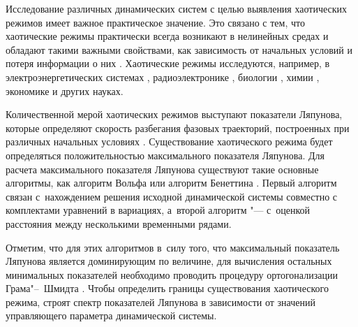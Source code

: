 
\date{}








\renewcommand{\JournalDataOnline}{\displaydate{parovike}}




\makerutitle





 Исследование различных динамических систем с целью выявления хаотических режимов имеет важное практическое значение. Это связано с тем, что хаотические режимы практически всегда возникают в нелинейных средах и обладают такими важными свойствами, как зависимость от начальных условий и потеря информации о них \cite{parovik:1}.  Хаотические режимы исследуются, например, в электроэнергетических системах \cite{parovik:2, parovik:3},  радиоэлектронике \cite{parovik:4}, биологии \cite{parovik:5}, химии \cite{parovik:6}, экономике \cite{parovik:7} и  других науках.



Количественной мерой хаотических режимов выступают показатели Ляпунова, которые определяют скорость разбегания фазовых траекторий, построенных при различных начальных условиях \cite{parovik:8}. Существование хаотического режима будет определяться положительностью максимального показателя Ляпунова. Для расчета максимального показателя Ляпунова существуют такие основные алгоритмы, как алгоритм Вольфа \cite{parovik:9} или алгоритм Бенеттина \cite{parovik:10, parovik:10a}. Первый алгоритм связан с~нахождением решения исходной динамической системы совместно с комплектами уравнений в вариациях, а~второй алгоритм "--- с~оценкой расстояния между несколькими временными рядами. 

Отметим, что для этих алгоритмов в~силу того, что максимальный показатель Ляпунова является доминирующим по величине, для вычисления остальных минимальных показателей необходимо проводить процедуру ортогонализации Грама"--~Шмидта \cite[Chapter~4, pp.~44--46]{parovik:11}. Чтобы определить границы существования хаотического режима, строят спектр показателей Ляпунова в зависимости от значений управляющего параметра динамической системы. 



